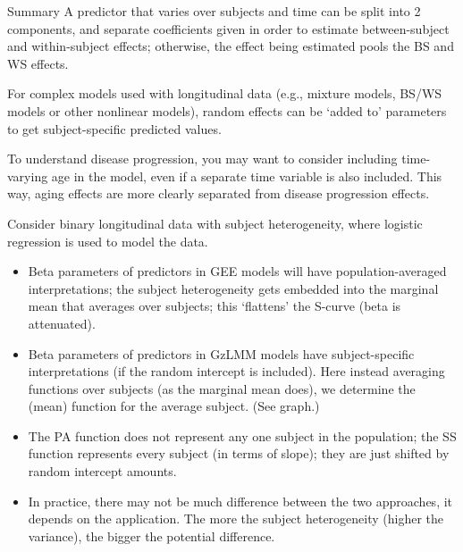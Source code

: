 \documentclass[
  9pt,
  ignorenonframetext,
]{beamer}
\begin{document}
\begin{frame}{Summary}
\protect\hypertarget{summary-1}{}
A predictor that varies over subjects and time can be split into 2
components, and separate coefficients given in order to estimate
between-subject and within-subject effects; otherwise, the effect being
estimated pools the BS and WS effects.

For complex models used with longitudinal data (e.g., mixture models,
BS/WS models or other nonlinear models), random effects can be `added
to' parameters to get subject-specific predicted values.

To understand disease progression, you may want to consider including
time-varying age in the model, even if a separate time variable is also
included. This way, aging effects are more clearly separated from
disease progression effects.
\end{frame}

\begin{frame}{}
\protect\hypertarget{section-17}{}
Consider binary longitudinal data with subject heterogeneity, where
logistic regression is used to model the data.

\begin{itemize}
\item
  Beta parameters of predictors in GEE models will have
  population-averaged interpretations; the subject heterogeneity gets
  embedded into the marginal mean that averages over subjects; this
  `flattens' the S-curve (beta is attenuated).
\item
  Beta parameters of predictors in GzLMM models have subject-specific
  interpretations (if the random intercept is included). Here instead
  averaging functions over subjects (as the marginal mean does), we
  determine the (mean) function for the average subject. (See graph.)
\item
  The PA function does not represent any one subject in the population;
  the SS function represents every subject (in terms of slope); they are
  just shifted by random intercept amounts.
\item
  In practice, there may not be much difference between the two
  approaches, it depends on the application. The more the subject
  heterogeneity (higher the variance), the bigger the potential
  difference.
\end{itemize}
\end{frame}
\end{document}
